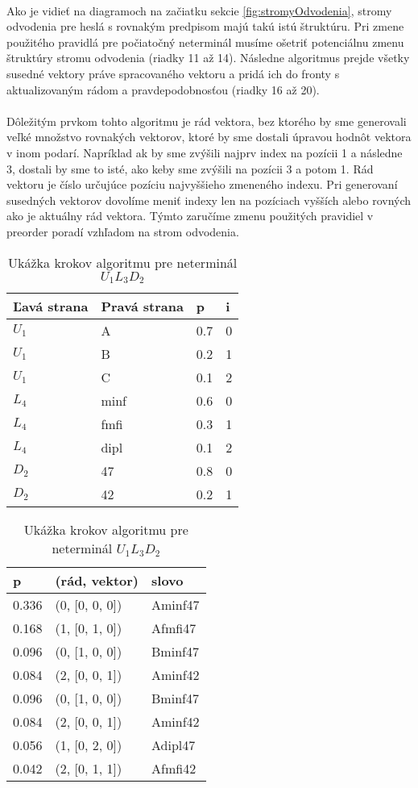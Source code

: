 \paragraph{}
Ako je vidieť na diagramoch na začiatku sekcie \ref{fig:stromyOdvodenia}, stromy odvodenia pre heslá s rovnakým predpisom majú takú istú štruktúru. Pri zmene použitého pravidlá pre počiatočný neterminál musíme ošetriť potenciálnu zmenu štruktúry stromu odvodenia (riadky 11 až 14). Následne algoritmus prejde všetky susedné vektory práve spracovaného vektoru a pridá ich do fronty s aktualizovaným rádom a pravdepodobnosťou (riadky 16 až 20).

\paragraph{}
Dôležitým prvkom tohto algoritmu je rád vektora, bez ktorého by sme generovali veľké množstvo rovnakých vektorov, ktoré by sme dostali úpravou hodnôt vektora v inom podarí. Napríklad ak by sme zvýšili najprv index na pozícii 1 a následne 3, dostali by sme to isté, ako keby sme zvýšili na pozícii 3 a potom 1. Rád vektoru je číslo určujúce pozíciu najvyššieho zmeneného indexu. Pri generovaní susedných vektorov dovolíme meniť indexy len na pozíciach vyšších alebo rovných ako je aktuálny rád vektora. Týmto zaručíme zmenu použitých pravidiel v preorder poradí vzhľadom na strom odvodenia.

\begin{table}[]
\centering
\caption{Ukážka krokov algoritmu pre neterminál \(U_1L_3D_2\)}
\label{postupAlgoritmu}
\begin{tabular}{l|lll}
Ľavá strana & Pravá strana & p & i \\ \hline
\(U_1\) & A & 0.7 & 0 \\
\(U_1\) & B & 0.2 & 1 \\
\(U_1\) & C & 0.1 & 2 \\
\(L_4\) & minf & 0.6 & 0 \\
\(L_4\) & fmfi & 0.3 & 1 \\
\(L_4\) & dipl & 0.1 & 2 \\
\(D_2\) & 47 & 0.8 & 0 \\
\(D_2\) & 42 & 0.2 & 1 \\
\end{tabular}
\quad
\begin{tabular}{lll}
p & (rád, vektor) & slovo \\ \hline
0.336 & (0, [0, 0, 0]) & Aminf47 \\ \hline \hline
0.168 & (1, [0, 1, 0]) & Afmfi47 \\
0.096 & (0, [1, 0, 0]) & Bminf47 \\
0.084 & (2, [0, 0, 1]) & Aminf42 \\ \hline \hline
0.096 & (0, [1, 0, 0]) & Bminf47 \\
0.084 & (2, [0, 0, 1]) & Aminf42 \\
0.056 & (1, [0, 2, 0]) & Adipl47 \\
0.042 & (2, [0, 1, 1]) & Afmfi42
\end{tabular}
\end{table}

